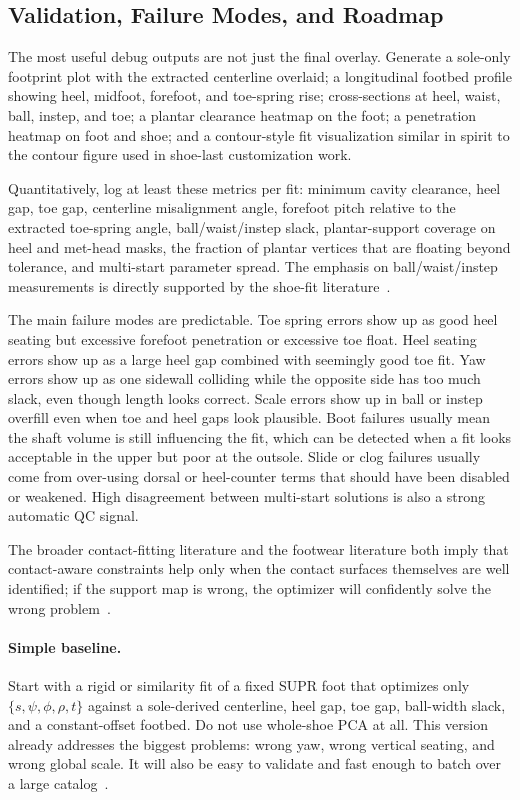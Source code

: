 \documentclass[11pt]{article}
\begin{document}
\subsection{Validation, Failure Modes, and Roadmap}

The most useful debug outputs are not just the final overlay. Generate a sole-only footprint plot with the extracted centerline overlaid; a longitudinal footbed profile showing heel, midfoot, forefoot, and toe-spring rise; cross-sections at heel, waist, ball, instep, and toe; a plantar clearance heatmap on the foot; a penetration heatmap on foot and shoe; and a contour-style fit visualization similar in spirit to the contour figure used in shoe-last customization work.

Quantitatively, log at least these metrics per fit: minimum cavity clearance, heel gap, toe gap, centerline misalignment angle, forefoot pitch relative to the extracted toe-spring angle, ball/waist/instep slack, plantar-support coverage on heel and met-head masks, the fraction of plantar vertices that are floating beyond tolerance, and multi-start parameter spread. The emphasis on ball/waist/instep measurements is directly supported by the shoe-fit literature~\cite{cad-last,fitness-lasts}.

The main failure modes are predictable. Toe spring errors show up as good heel seating but excessive forefoot penetration or excessive toe float. Heel seating errors show up as a large heel gap combined with seemingly good toe fit. Yaw errors show up as one sidewall colliding while the opposite side has too much slack, even though length looks correct. Scale errors show up in ball or instep overfill even when toe and heel gaps look plausible. Boot failures usually mean the shaft volume is still influencing the fit, which can be detected when a fit looks acceptable in the upper but poor at the outsole. Slide or clog failures usually come from over-using dorsal or heel-counter terms that should have been disabled or weakened. High disagreement between multi-start solutions is also a strong automatic QC signal.

The broader contact-fitting literature and the footwear literature both imply that contact-aware constraints help only when the contact surfaces themselves are well identified; if the support map is wrong, the optimizer will confidently solve the wrong problem~\cite{ease-allowance,prox,contactopt,rollover}.

\paragraph{Simple baseline.}
Start with a rigid or similarity fit of a fixed SUPR foot that optimizes only $\{s,\psi,\phi,\rho,t\}$ against a sole-derived centerline, heel gap, toe gap, ball-width slack, and a constant-offset footbed. Do not use whole-shoe PCA at all. This version already addresses the biggest problems: wrong yaw, wrong vertical seating, and wrong global scale. It will also be easy to validate and fast enough to batch over a large catalog~\cite{witana-foot-measurements}.
\end{document}
